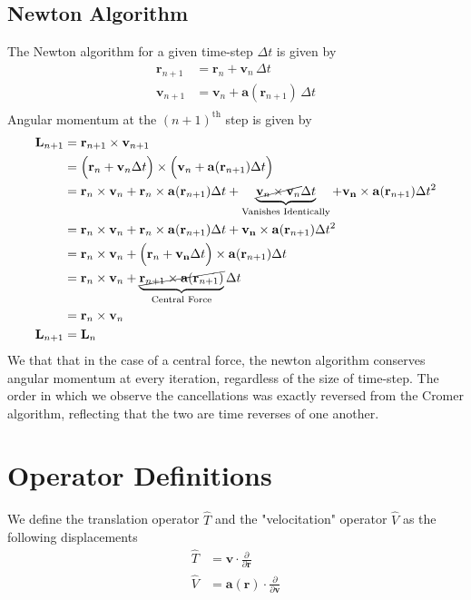 \documentclass[8pt,a4paper]{article}
\begin{document}
	\subsection{Newton Algorithm}
	The Newton algorithm for a given time-step $\Delta t$ is given by
	\begin{align} \label{newton}
		\mathbf{r}_{n+1} &= \mathbf{r}_n + \mathbf{v}_n \, \Delta t \nonumber \\
		\mathbf{v}_{n+1} &= \mathbf{v}_n + \mathbf{a}(\mathbf{r}_{n+1}) \, \Delta t \nonumber \\
	\end{align}
	Angular momentum at the $(n+1)^\mathrm{th}$ step is given by
	\begin{align}
		\mathbf{L}_{n+1} &= \mathbf{r}_{n+1} \times \mathbf{v}_{n+1} \nonumber \\
		&= \Big(\mathbf{r}_n + \mathbf{v}_n \Delta t\Big) \times \Big(\mathbf{v}_n + \mathbf{a}(\mathbf{r}_{n+1})\Delta t\Big) \nonumber \\
		&= \mathbf{r}_n \times \mathbf{v}_n + \mathbf{r}_n \times \mathbf{a}(\mathbf{r}_{n+1})\Delta t + \underbrace{\cancel{\mathbf{v}_n\times\mathbf{v}_n}\Delta t}_{\text{Vanishes Identically}} + \mathbf{v_n}\times\mathbf{a}(\mathbf{r}_{n+1}) \Delta t ^2 \nonumber \\
		&= \mathbf{r}_n \times \mathbf{v}_n + \mathbf{r}_n \times \mathbf{a}(\mathbf{r}_{n+1})\Delta t + \mathbf{v_n}\times\mathbf{a}(\mathbf{r}_{n+1}) \Delta t ^2 \nonumber \\
		&= \mathbf{r}_n \times \mathbf{v}_n + \Big(\mathbf{r}_n + \mathbf{v_n}\Delta t\Big)\times\mathbf{a}(\mathbf{r}_{n+1}) \Delta t \nonumber \\
		&= \mathbf{r}_n \times \mathbf{v}_n + \underbrace{\cancel{\mathbf{r}_{n+1}\times\mathbf{a}(\mathbf{r}_{n+1})}}_{\text{Central Force}} \Delta t \nonumber \\
		&= \mathbf{r}_n \times \mathbf{v}_n \nonumber \\
		\mathbf{L}_{n+1}	 &= \mathbf{L}_n					 
	\end{align}
	We that that in the case of a central force, the newton algorithm conserves angular momentum at every iteration, regardless of the size of time-step. The order in which we observe the cancellations was exactly reversed from the Cromer algorithm, reflecting that the two are time reverses of one another.
	
	\section{Operator Definitions}
	We define the translation operator $\hat{T}$ and the "velocitation" operator $\hat{V}$ as the following displacements
	\begin{align}
		\hat{T} &= \mathbf{v}\cdot \frac{\partial}{\partial \mathbf{r}} \\
		\hat{V} &= \mathbf{a}(\mathbf{r})\cdot \frac{\partial}{\partial \mathbf{v}}
	\end{align}
	
\end{document}

